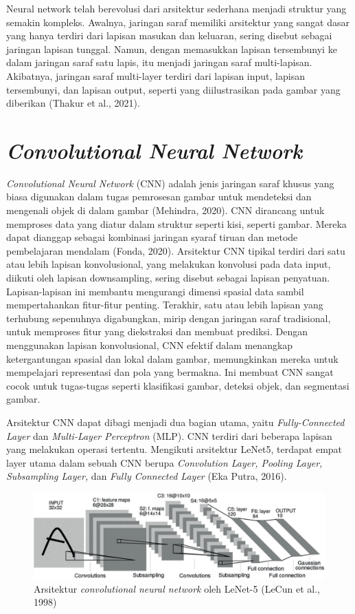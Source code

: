 Neural network telah berevolusi dari arsitektur sederhana menjadi struktur yang semakin kompleks. Awalnya, jaringan saraf memiliki arsitektur yang sangat dasar yang hanya terdiri dari lapisan masukan dan keluaran, sering disebut sebagai jaringan lapisan tunggal. Namun, dengan memasukkan lapisan tersembunyi ke dalam jaringan saraf satu lapis, itu menjadi jaringan saraf multi-lapisan. Akibatnya, jaringan saraf multi-layer terdiri dari lapisan input, lapisan tersembunyi, dan lapisan output, seperti yang diilustrasikan pada gambar yang diberikan (Thakur et al., 2021).

\section{\emph{Convolutional Neural Network}}
\label{sec:cnn}

\emph{Convolutional Neural Network} (CNN) adalah jenis jaringan saraf khusus yang biasa digunakan dalam tugas pemrosesan gambar untuk mendeteksi dan mengenali objek di dalam gambar (Mehindra, 2020). CNN dirancang untuk memproses data yang diatur dalam struktur seperti kisi, seperti gambar. Mereka dapat dianggap sebagai kombinasi jaringan syaraf tiruan dan metode pembelajaran mendalam (Fonda, 2020). Arsitektur CNN tipikal terdiri dari satu atau lebih lapisan konvolusional, yang melakukan konvolusi pada data input, diikuti oleh lapisan downsampling, sering disebut sebagai lapisan penyatuan. Lapisan-lapisan ini membantu mengurangi dimensi spasial data sambil mempertahankan fitur-fitur penting. Terakhir, satu atau lebih lapisan yang terhubung sepenuhnya digabungkan, mirip dengan jaringan saraf tradisional, untuk memproses fitur yang diekstraksi dan membuat prediksi. Dengan menggunakan lapisan konvolusional, CNN efektif dalam menangkap ketergantungan spasial dan lokal dalam gambar, memungkinkan mereka untuk mempelajari representasi dan pola yang bermakna. Ini membuat CNN sangat cocok untuk tugas-tugas seperti klasifikasi gambar, deteksi objek, dan segmentasi gambar.

Arsitektur CNN dapat dibagi menjadi dua bagian utama, yaitu \emph{Fully-Connected Layer} dan \emph{Multi-Layer Perceptron} (MLP). CNN terdiri dari beberapa lapisan yang melakukan operasi tertentu. Mengikuti arsitektur LeNet5, terdapat empat layer utama dalam sebuah CNN berupa \emph{Convolution Layer, Pooling Layer, Subsampling Layer,} dan \emph{Fully Connected Layer} (Eka Putra, 2016). 

\begin{figure}[H]
  \centering
  \includegraphics[scale=0.8]{gambar/arsitekturcnn.png}
  \caption{Arsitektur \emph{convolutional neural network} oleh LeNet-5 (LeCun et al., 1998)}
  \label{fig:arsicnn}
\end{figure}

